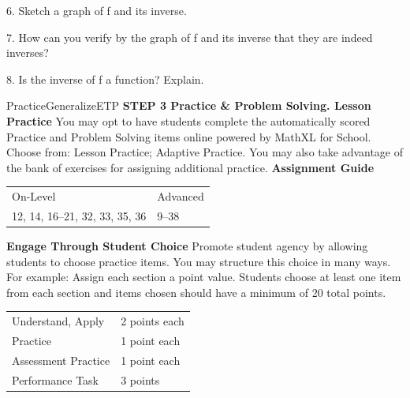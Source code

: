 \documentclass{article}
\newenvironment{concept-summary}{}{}    %
\newenvironment{te-addendum}[2]{}{}     %
\newcommand{\answer}[1]{}               %
\newcommand{\placeholder}[2]{}          %
\newcommand{\te}[1]{}                   %
\begin{document}
\begin{concept-summary}
\answer{(f(f^{-1}(x))=-\frac12(-2x+10)+5=x-5+5=x), (f^{-1}(f(x))=-2(-\frac12x+5)+10=x-10+10=x)}
6. Sketch a graph of f and its inverse.
\placeholder{graph}{Printed answer: first quadrant unit grid x,y from 0 to 10, numbered every 2. Blue line f through (0,5) and (10,0); orange inverse through (0,10) and (5,0). Curves intersect near (3.33,3.33), arrows visible at blue lower right and orange upper left.}
\answer{Graph shown.}
7. How can you verify by the graph of f and its inverse that they are indeed inverses?
\answer{(f(x)) and (f^{-1}(x)) are reflections of each other over the line (y=x). Therefore, (f(x)) and (f^{-1}(x)) are inverses.}
8. Is the inverse of f a function? Explain.
\answer{Yes; each independent value is paired with only one dependent value.}
\te{Concept Summary, Do You Understand, and Do You Know How are available at SavvasRealize.com. Presentation; Practice. Answers for practice 9--13 on this page are transcribed with their items.}
\end{concept-summary}
\begin{te-addendum}{Practice}{GeneralizeETP}
\textbf{STEP 3 Practice \& Problem Solving. Lesson Practice}
You may opt to have students complete the automatically scored Practice and Problem Solving items online powered by MathXL for School.
Choose from: Lesson Practice; Adaptive Practice.
You may also take advantage of the bank of exercises for assigning additional practice.
\textbf{Assignment Guide}
\begin{tabular}{ll}
On-Level & Advanced \\
12, 14, 16--21, 32, 33, 35, 36 & 9--38 \\
\end{tabular}
\textbf{Engage Through Student Choice}
Promote student agency by allowing students to choose practice items. You may structure this choice in many ways.
For example:
Assign each section a point value. Students choose at least one item from each section and items chosen should have a minimum of 20 total points.
\begin{tabular}{ll}
Understand, Apply & 2 points each \\
Practice & 1 point each \\
Assessment Practice & 1 point each \\
Performance Task & 3 points \\
\end{tabular}
\te{Practice \& Problem Solving and video tutorials are available at SavvasRealize.com. Scan the QR code to access a video tutorial.}
\end{te-addendum}
\end{document}
